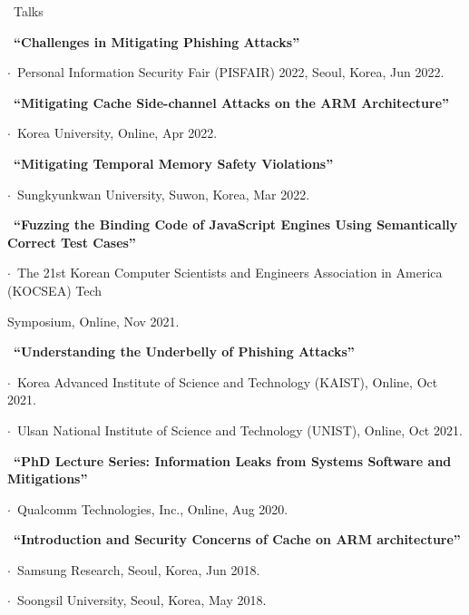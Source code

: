 \documentclass{resume} %
\begin{document}
\begin{rSection}{\faGenderless~Talks}

	\strut\textbullet~{\bf ``Challenges in Mitigating Phishing Attacks''}\\
	\strut\hspace{1cm}$\cdot$~Personal Information Security Fair (PISFAIR) 2022, Seoul, Korea, Jun 2022.

	\strut\textbullet~{\bf ``Mitigating Cache Side-channel Attacks on the ARM Architecture''}\\
	\strut\hspace{1cm}$\cdot$~Korea University, Online, Apr 2022.

	\strut\textbullet~{\bf ``Mitigating Temporal Memory Safety Violations''}\\
	\strut\hspace{1cm}$\cdot$~Sungkyunkwan University, Suwon, Korea, Mar 2022.

	\strut\textbullet~{\bf ``Fuzzing the Binding Code of JavaScript Engines Using Semantically Correct Test Cases''}\\
	\strut\hspace{1cm}$\cdot$~The 21st Korean Computer Scientists and Engineers Association in America (KOCSEA) Tech\\ \strut\hspace{1cm} Symposium, Online, Nov 2021.

	\strut\textbullet~{\bf ``Understanding the Underbelly of Phishing Attacks''}\\
	\strut\hspace{1cm}$\cdot$~Korea Advanced Institute of Science and Technology (KAIST), Online, Oct 2021.\\
	\strut\hspace{1cm}$\cdot$~Ulsan National Institute of Science and Technology (UNIST), Online, Oct 2021.

    \strut\textbullet~{\bf ``PhD Lecture Series: Information Leaks from Systems Software and Mitigations''}\\
    \strut\hspace{1cm}$\cdot$~Qualcomm Technologies, Inc., Online, Aug 2020.
	
    \strut\textbullet~{\bf ``Introduction and Security Concerns of Cache on ARM architecture''}\\
	\strut\hspace{1cm}$\cdot$~Samsung Research, Seoul, Korea, Jun 2018.\\
	\strut\hspace{1cm}$\cdot$~Soongsil University, Seoul, Korea, May 2018.

	\vspace{3mm}
\end{rSection}
\end{document}
